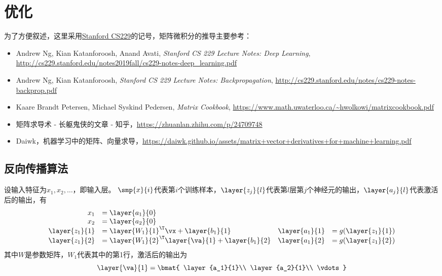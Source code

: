 
\section{优化} %
为了方便叙述，这里采用\href{http://cs229.stanford.edu/notes2019fall/cs229-notes-deep_learning.pdf}{Stanford CS229}的记号，矩阵微积分的推导主要参考：
\begin{itemize}
    \item Andrew Ng, Kian Katanforoosh, Anand Avati, \emph{Stanford CS 229 Lecture Notes: Deep Learning}, \url{http://cs229.stanford.edu/notes2019fall/cs229-notes-deep_learning.pdf}
    \item Andrew Ng, Kian Katanforoosh, \emph{Stanford CS 229 Lecture Notes: Backpropagation}, \url{http://cs229.stanford.edu/notes/cs229-notes-backprop.pdf}
    \item Kaare Brandt Petersen, Michael Syskind Pedersen, \emph{Matrix Cookbook}, \url{https://www.math.uwaterloo.ca/~hwolkowi/matrixcookbook.pdf}
    \item 矩阵求导术 - 长躯鬼侠的文章 - 知乎，\url{https://zhuanlan.zhihu.com/p/24709748}
    \item Daiwk，机器学习中的矩阵、向量求导，\url{https://daiwk.github.io/assets/matrix+vector+derivatives+for+machine+learning.pdf}
\end{itemize}

\subsection{反向传播算法}
设输入特征为$x_1,x_2,\ldots$，即输入层。
$\smp{x}{i}$代表第$i$个训练样本，$\layer{z_j}{l}$代表第$l$层第$j$个神经元的输出，$\layer{a_j}{l}$代表激活后的输出，有
\[\begin{array}{rlrl}
x_1 &= \layer{a_1}{0} & & \\
x_2 &= \layer{a_2}{0} & & \\
\layer{z_1}{1}&=\layer{W_1}{1}^\T\vx+\layer{b_1}{1} &
\layer{a_1}{1}&=g(\layer{z_1}{1})\\
\layer{z_1}{2}&=\layer{W_1}{2}^\T\layer{\va}{1}+\layer{b_1}{2} &
\layer{a_1}{2}&=g(\layer{z_1}{2})
\end{array}\]
其中$W$是参数矩阵，$W_1$代表其中的第1行，激活后的输出为
\[\layer{\va}{1}=\bmat{
    \layer{a_1}{1}\\
    \layer{a_2}{1}\\
    \vdots
}\]

